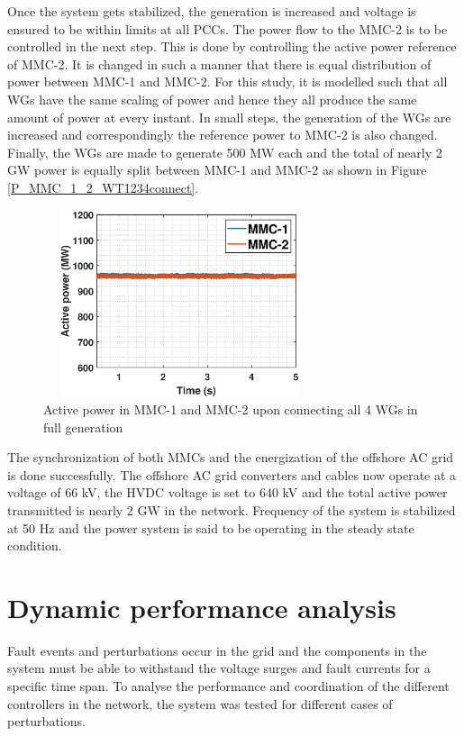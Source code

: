 Once the system gets stabilized, the generation is increased and voltage is ensured to be within limits at all \gls{PCC}s. The power flow to the \gls{MMC}-2 is to be controlled in the next step. This is done by controlling the active power reference of \gls{MMC}-2. It is changed in such a manner that there is equal distribution of power between \gls{MMC}-1 and \gls{MMC}-2. For this study, it is modelled such that all \gls{WG}s have the same scaling of power and hence they all produce the same amount of power at every instant. In small steps, the generation of the \gls{WG}s are increased and correspondingly the reference power to \gls{MMC}-2 is also changed. Finally, the \gls{WG}s are made to generate 500 MW each and the total of nearly 2 GW power is equally split between \gls{MMC}-1 and \gls{MMC}-2 as shown in Figure \ref{P_MMC_1_2_WT1234connect}.

\begin{figure}[H]
\centering
    \includegraphics[height = 5.5cm,width = 8cm]{Diagrams/Chapter_5/P_MMC_1_2_All_WTconnect.eps}
    \caption{Active power in MMC-1 and MMC-2 upon connecting all 4 WGs in full generation}
    \label{P_MMC_1_2_All_WTconnect}
\end{figure}

The synchronization of both \gls{MMC}s and the energization of the offshore \gls{AC} grid is done successfully. The offshore \gls{AC} grid converters and cables now operate at a voltage of 66 kV, the \gls{HVDC} voltage is set to 640 kV and the total active power transmitted is nearly 2 GW in the network. Frequency of the system is stabilized at 50 Hz and the power system is said to be operating in the steady state condition.  

\section{Dynamic performance analysis}
Fault events and perturbations occur in the grid and the components in the system must be able to withstand the voltage surges and fault currents for a specific time span. To analyse the performance and coordination of the different controllers in the network, the system was tested for different cases of perturbations.  

